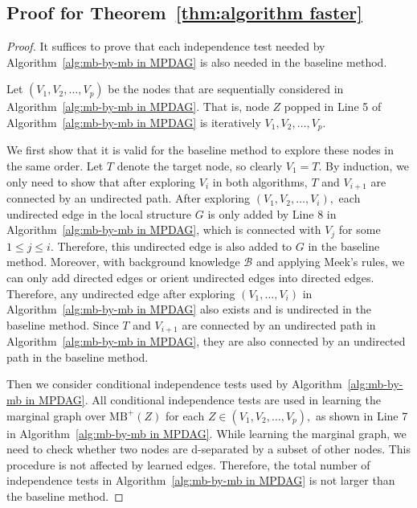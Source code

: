 \documentclass{article}
\begin{document}
\subsection{Proof for Theorem~\ref{thm:algorithm faster}}
\begin{proof}
It suffices to prove that each independence test needed by Algorithm~\ref{alg:mb-by-mb in MPDAG} is also needed in the baseline method. 

Let $(V_1,V_2,\dots,V_p)$ be the nodes that are sequentially considered in Algorithm~\ref{alg:mb-by-mb in MPDAG}. That is, node $Z$ popped in Line 5 of Algorithm~\ref{alg:mb-by-mb in MPDAG} is iteratively $V_1,V_2,\dots,V_p.$ 

We first show that it is valid for the baseline method to explore these nodes in the same order. Let $T$ denote the target node, so clearly $V_1=T.$ By induction, we only need to show that after exploring $V_i$ in both algorithms, $T$ and $V_{i+1}$ are connected by an undirected path. After exploring $(V_1,V_2,\dots,V_i),$ each undirected edge in the local structure $G$ is only added by Line 8 in Algorithm~\ref{alg:mb-by-mb in MPDAG}, which is connected with $V_j$ for some $1\le j\le i.$ Therefore, this undirected edge is also added to $G$ in the baseline method. Moreover, with background knowledge $\mathcal{B}$ and applying Meek's rules, we can only add directed edges or orient undirected edges into directed edges. Therefore, any undirected edge after exploring $(V_1,\dots,V_i)$ in Algorithm~\ref{alg:mb-by-mb in MPDAG} also exists and is undirected in the baseline method. Since $T$ and $V_{i+1}$ are connected by an undirected path in Algorithm~\ref{alg:mb-by-mb in MPDAG}, they are also connected by an undirected path in the baseline method.

Then we consider conditional independence tests used by Algorithm~\ref{alg:mb-by-mb in MPDAG}. All conditional independence tests are used in learning the marginal graph over $\mathrm{MB}^+(Z)$ for each $Z\in (V_1,V_2,\dots,V_p),$ as shown in Line 7 in Algorithm~\ref{alg:mb-by-mb in MPDAG}. While learning the marginal graph, we need to check whether two nodes are d-separated by a subset of other nodes. This procedure is not affected by learned edges. Therefore, the total number of independence tests in Algorithm~\ref{alg:mb-by-mb in MPDAG} is not larger than the baseline method.
\end{proof}
\end{document}
